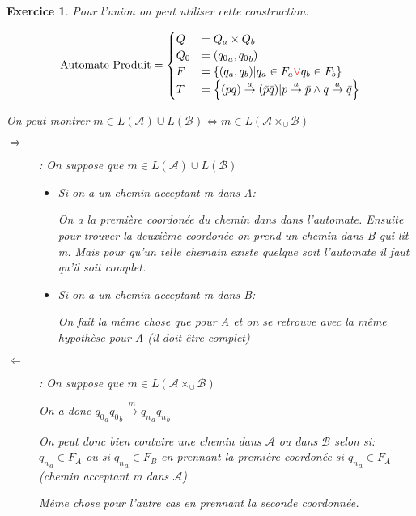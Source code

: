 \documentclass{article}
\theoremstyle{plain}
\newtheorem{exo}{Exercice}%
\begin{document}
\begin{exo}
  Pour l'union on peut utiliser cette construction:

  \[\text{Automate Produit} =
    \begin{cases}
      Q   &= Q_a \times Q_b \\
      Q_0 &= ({q_0}_a, {q_0}_b) \\
      F   &= \left\{(q_a, q_b) | q_a \in F_a {\color{red} \vee} q_b \in F_b \right\}\\
      T   &= \left\{(pq) \overset{a}{\to} (\bar{p}\bar{q}) 
                | p \overset{a}{\to} \bar{p} \land q \overset{a}{\to} \bar{q} \right\}    
    \end{cases}  
  \]

    On peut montrer $m \in L(\mathcal{A}) \cup L(\mathcal{B}) 
          \Leftrightarrow m \in L(\mathcal{A} \times_{\cup} \mathcal{B})$

    \begin{description}
      \item[$\Rightarrow$]: On suppose que $m \in L(\mathcal{A}) \cup L(\mathcal{B})$

      \begin{itemize}
        \item Si on a un chemin acceptant m dans A:

          On a la première coordonée du chemin dans dans l'automate. 
          Ensuite pour trouver la deuxième coordonée on prend un chemin 
          dans B qui lit m. Mais pour qu'un telle chemain existe quelque soit 
          l'automate il faut qu'il soit complet.

        \item Si on a un chemin acceptant m dans B:

          On fait la même chose que pour A et on se retrouve avec la même 
          hypothèse pour A (il doit être complet)
      \end{itemize}

      \item[$\Leftarrow$]: On suppose que 
        $m \in L(\mathcal{A} \times_{\cup} \mathcal{B})$

        On a donc ${q_0}_a {q_0}_b \overset{m}{\to} {q_n}_a {q_n}_b$

        On peut donc bien contuire une chemin dans $\mathcal{A}$ ou dans $\mathcal{B}$
        selon si: ${q_n}_a \in F_A$ ou si ${q_n}_a \in F_B$ en prennant 
        la première coordonée si ${q_n}_a \in F_A$ 
        (chemin acceptant m dans $\mathcal{A}$). 

        Même chose pour l'autre cas en prennant la seconde coordonnée.

    \end{description}
\end{exo}
\end{document}

